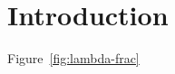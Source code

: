 \documentclass[acmsmall]{acmart}
\begin{document}



\maketitle


\section{Introduction}

\citet{Boyland:2003aa,Zhao:2007aa,Boyland:2010aa,Boyland:2013aa}

Figure~\ref{fig:lambda-frac}
\end{document}
